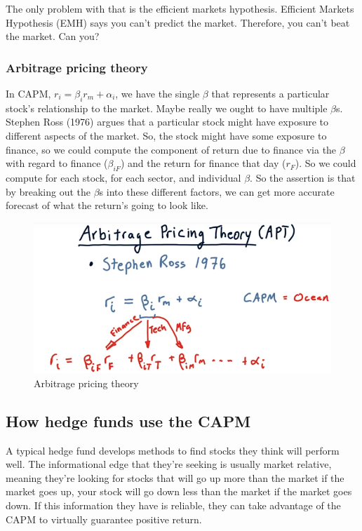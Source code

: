\documentclass[12pt]{article}
\begin{document}
The only problem with that is the efficient markets hypothesis. Efficient Markets Hypothesis (EMH) says you can't predict the market. Therefore, you can't beat the market. Can you?

\subsubsection{Arbitrage pricing theory}

In CAPM, $r_i = \beta_ir_m + \alpha_i$, we have the single $\beta$ that represents a particular stock's relationship to the market. Maybe really we ought to have multiple $\beta$s. Stephen Ross (1976) argues that a particular stock might have exposure to different aspects of the market. So, the stock might have some exposure to finance, so we could compute the component of return due to finance via the $\beta$ with regard to finance ($\beta_{iF}$) and the return for finance that day ($r_F$). So we could compute for each stock, for each sector, and individual $\beta$. So the assertion is that by breaking out the $\beta$s into these different factors, we can get more accurate forecast of what the return's going to look like. 

\begin{figure}[!ht]
\centering
\includegraphics[scale=0.4]{fig/fig40}
\caption{Arbitrage pricing theory}
\end{figure}

\subsection{How hedge funds use the CAPM}

A typical hedge fund develops methods to find stocks they think will perform well. The informational edge that they're seeking is usually market relative, meaning they're looking for stocks that will go up more than the market if the market goes up, your stock will go down less than the market if the market goes down. If this information they have is reliable, they can take advantage of the CAPM to virtually guarantee positive return. 
\end{document}
